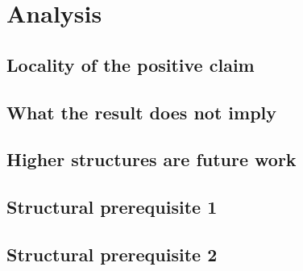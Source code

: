 \section{Analysis}\label{sec:analysis}


\subsection{Locality of the positive claim}\label{subsec:locality-of-claim}


\subsection{What the result does not imply}\label{subsec:what-not-implied}


\subsection{Higher structures are future work}\label{subsec:higher-structures-future-work}


\subsection{Structural prerequisite 1}\label{subsec:structural-prerequisite-1}


\subsection{Structural prerequisite 2}\label{subsec:structural-prerequisite-2}

